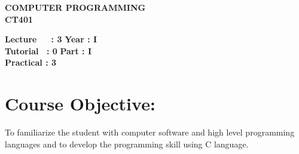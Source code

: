 \begin{center}
    \textbf{\huge{\uppercase{Computer Programming}}}
    \\
    \vspace{.5cm}
    \textbf{\large{CT401}}
\end{center}

\noindent\textbf{Lecture\ \ \ : 3} \hfill \textbf{Year : I } \\
\textbf{Tutorial \ : 0} \hfill \textbf{Part : I } \\
\textbf{Practical : 3}  \\

\par
\noindent 
\section*{Course Objective:}
To familiarize the student with computer software and high level programming languages and to develop the programming skill using C language.

